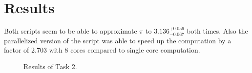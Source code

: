 \documentclass{aa}
\begin{document}
\section{Results}%
\label{sec:results}

Both scripts seem to be able to approximate \(\pi\) to \(3.136_{-0.067}^{+0.056}\) both times.
Also the parallelized version of the script was able to speed up the computation by a factor of
2.703 with 8 cores compared to single core computation.

\begin{figure*}[htbp]
    \centering
    \captionsetup{width = 0.9 \linewidth}
    \caption{Results of Task 2.}
    \label{fig:Multipi_8_cores}
\end{figure*}
\end{document}
